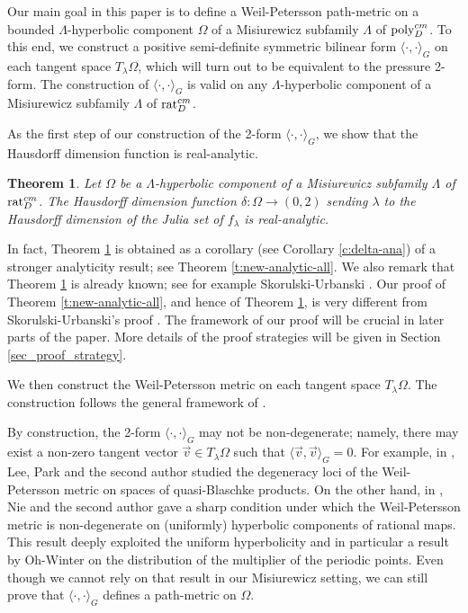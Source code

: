 \documentclass[11pt]{amsart}
\theoremstyle{plain}
\newtheorem{thm}{Theorem}[section]
\theoremstyle{definition}
\theoremstyle{remark}
\begin{document}
Our main goal in this paper
is to define a
Weil-Petersson
path-metric
on a bounded $\Lambda$-hyperbolic component $\Omega$ of a Misiurewicz subfamily $\Lambda$ of ${\rm poly}_D^{cm}$. To this end, we construct a positive semi-definite symmetric bilinear form $\langle \cdot, \cdot \rangle_G$ on each tangent space $T_{\lambda}\Omega$, which will turn out to be equivalent to the pressure 2-form.
The construction of $\langle \cdot, \cdot \rangle_G$ is valid on any $\Lambda$-hyperbolic component of a Misiurewicz subfamily $\Lambda$ of ${\rm rat}_D^{cm}$.

As the first step of our construction of the 2-form $\langle \cdot, \cdot \rangle_G$, we show that the Hausdorff dimension function is real-analytic.


\begin{thm}\label{thm_ana_main}
Let $\Omega$ be a $\Lambda$-hyperbolic component of a Misiurewicz subfamily $\Lambda$ of ${\rm rat}_D^{cm}$. The Hausdorff dimension function $\delta \colon \Omega \to (0,2)$ sending $\lambda$ to the Hausdorff dimension of the Julia set of $f_\lambda$ is real-analytic.
\end{thm}

In fact, Theorem \ref{thm_ana_main} is obtained as a corollary (see Corollary \ref{c:delta-ana}) of a stronger analyticity result;
see Theorem \ref{t:new-analytic-all}. We also remark that Theorem \ref{thm_ana_main} is already known; see for example Skorulski-Urbanski \cite{SkorulskiUrbanski14}. Our proof of Theorem \ref{t:new-analytic-all}, and hence of Theorem \ref{thm_ana_main},
is very different from Skorulski-Urbanski's proof \cite{SkorulskiUrbanski14}. The framework of our
proof will be crucial in later parts of the paper. More details of the proof strategies will be given in Section \ref{sec_proof_strategy}.

\medskip

We then construct the Weil-Petersson metric
on each tangent space $T_{\lambda}\Omega$. The construction follows the general framework of \cite{HeNie23, BH24}. 

\medskip

By construction, the 2-form $\langle \cdot, \cdot \rangle_G$ may not be non-degenerate; namely, there may exist a non-zero tangent vector $\vec{v}\in T_\lambda\Omega$ such that $\langle \vec{v}, \vec{v} \rangle_G = 0$. For example, in \cite{HLP23,HLP25}, Lee, Park and the second author studied the degeneracy
loci of the Weil-Petersson metric on spaces of quasi-Blaschke products. On the other hand, in \cite{HeNie23}, Nie and the second author gave a sharp condition under which the Weil-Petersson metric is non-degenerate on (uniformly) hyperbolic components of rational maps.
This result deeply exploited the uniform hyperbolicity
and in particular a result by Oh-Winter  \cite{Oh17}
on the distribution of the
multiplier of the periodic points.
Even though we cannot rely on that result in our Misiurewicz setting, we can still prove that $\langle \cdot, \cdot \rangle_G$ defines a path-metric on $\Omega$.
\end{document}
